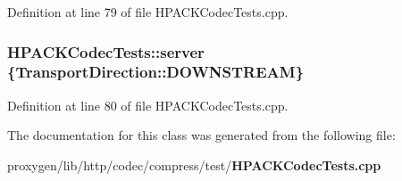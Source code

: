 Definition at line 79 of file H\+P\+A\+C\+K\+Codec\+Tests.\+cpp.

\subsubsection[{server}]{ H\+P\+A\+C\+K\+Codec\+Tests\+::server \{Transport\+Direction\+::\+D\+O\+W\+N\+S\+T\+R\+E\+AM\}\hspace{0.3cm}{\ttfamily [protected]}}\label{classHPACKCodecTests_ac76b12e313901aa1311c8e803d84f6c4}


Definition at line 80 of file H\+P\+A\+C\+K\+Codec\+Tests.\+cpp.



The documentation for this class was generated from the following file\+:\begin{DoxyCompactItemize}
\item 
proxygen/lib/http/codec/compress/test/{\bf H\+P\+A\+C\+K\+Codec\+Tests.\+cpp}\end{DoxyCompactItemize}
